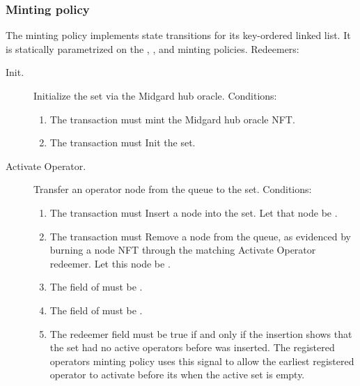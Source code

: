 \documentclass[../midgard.tex]{subfiles}
\begin{document}
\subsubsection{Minting policy}
\label{h:active-operators-minting-policy}

The  minting policy implements state transitions for its key-ordered linked list.
It is statically parametrized on the , , and  minting policies.
Redeemers:
\begin{description}
    \item[Init.] Initialize the  set via the Midgard hub oracle.
      Conditions:
        \begin{enumerate}
            \item The transaction must mint the Midgard hub oracle NFT.
            \item The transaction must Init the  set.
        \end{enumerate}
    \item[Activate Operator.] Transfer an operator node from the  queue to the  set.
      Conditions:
        \begin{enumerate}
            \item The transaction must Insert a node into the  set.
              Let that node be .
            \item The transaction must Remove a node from the  queue, as evidenced by burning a  node NFT through the matching Activate Operator redeemer.
              Let this node be .
            \item The  field of  must be .
            \item The  field of  must be .
            \item The  redeemer field must be true if and only if the insertion shows that the set had no active operators before  was inserted.
              The registered operators minting policy uses this signal to allow the earliest registered operator to activate before its  when the active set is empty.
        \end{enumerate}

\end{description}
\end{document}
